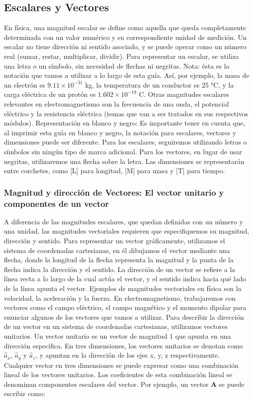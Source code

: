 \documentclass{article}
\begin{document}
\subsection{Escalares y Vectores}
En física, una magnitud escalar se define como aquella que queda completamente determinada con un valor numérico y su correspondiente unidad de medición. Un escalar no tiene dirección ni sentido asociado, y se puede operar como un número real (sumar, restar, multiplicar, dividir). Para representar un escalar, se utiliza una letra o un símbolo, sin necesidad de flechas ni negritas. Nota: ésta es la notación que vamos a utilizar a lo largo de esta guía.
Así, por ejemplo, la masa de un electrón es $9.11 \times 10^{-31}$ kg, la temperatura de un conductor es 25 °C, y la carga eléctrica de un protón es $1.602 \times 10^{-19}$ C. Otras magnitudes escalares relevantes en electromagnetismo son la frecuencia de una onda, el potencial eléctrico y la resistencia eléctrica (temas que van a ser tratados en sus respectivos módulos).
Representación en blanco y negro: Es importante tener en cuenta que, al imprimir esta guía en blanco y negro, la notación para escalares, vectores y dimensiones puede ser diferente. Para los escalares, seguiremos utilizando letras o símbolos sin ningún tipo de marca adicional. Para los vectores, en lugar de usar negritas, utilizaremos una flecha sobre la letra. Las dimensiones se representarán entre corchetes, como [L] para longitud, [M] para masa y [T] para tiempo.

\subsubsection{Magnitud y dirección de Vectores: El vector unitario y componentes de un vector}
A diferencia de las magnitudes escalares, que quedan definidas con un número y una unidad, las magnitudes vectoriales requieren que especifiquemos su magnitud, dirección y sentido. Para representar un vector gráficamente, utilizamos el sistema de coordenadas cartesianas, en él dibujamos el vector mediante una flecha, donde la longitud de la flecha representa la magnitud y la punta de la flecha indica la dirección y el sentido. La dirección de un vector se refiere a la línea recta a lo largo de la cual actúa el vector, y el sentido indica hacia qué lado de la línea apunta el vector. Ejemplos de magnitudes vectoriales en física son la velocidad, la aceleración y la fuerza. En electromagnetismo, trabajaremos con vectores como el campo eléctrico, el campo magnético y el momento dipolar para enunciar algunos de los vectores que vamos a utilizar.
Para describir la dirección de un vector en un sistema de coordenadas cartesianas, utilizamos vectores unitarios. Un vector unitario es un vector de magnitud 1 que apunta en una dirección específica. En tres dimensiones, los vectores unitarios se denotan como $\hat{a}_x$, $\hat{a}_y$ y $\hat{a}_z$, y apuntan en la dirección de los ejes x, y, z respectivamente.
Cualquier vector en tres dimensiones se puede expresar como una combinación lineal de los vectores unitarios. Los coeficientes de esta combinación lineal se denominan componentes escalares del vector. Por ejemplo, un vector $\mathbf{A}$ se puede escribir como:
\end{document}
